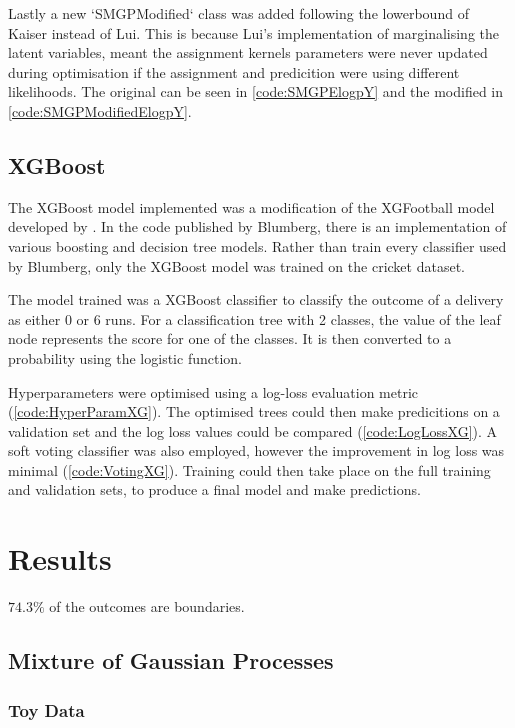 \documentclass[12pt,a4paper]{report}
\theoremstyle{definition}
\begin{document}
Lastly a new `SMGPModified` class was added following the lowerbound of Kaiser instead of Lui.
This is because Lui's implementation of marginalising the latent variables, meant the assignment kernels parameters were never updated during optimisation if the assignment and predicition were using different likelihoods.
The original can be seen in \ref{code:SMGPElogpY} and the modified in \ref{code:SMGPModifiedElogpY}.

\section{XGBoost}

The XGBoost \citep{Chen2016} model implemented was a modification of the XGFootball model developed by \citet{Blumberg2020}.
In the code published by Blumberg, there is an implementation of various boosting and decision tree models.
Rather than train every classifier used by Blumberg, only the XGBoost model was trained on the cricket dataset.

The model trained was a XGBoost classifier to classify the outcome of a delivery as either 0 or 6 runs.
For a classification tree with 2 classes, the value of the leaf node represents the score for one of the classes.
It is then converted to a probability using the logistic function.

Hyperparameters were optimised using a log-loss evaluation metric (\ref{code:HyperParamXG}).
The optimised trees could then make predicitions on a validation set and the log loss values could be compared (\ref{code:LogLossXG}).
A soft voting classifier was also employed, however the improvement in log loss was minimal (\ref{code:VotingXG}).
Training could then take place on the full training and validation sets, to produce a final model and make predictions.

\chapter{Results}

$74.3\%$ of the outcomes are boundaries.

\section{Mixture of Gaussian Processes}

\subsection{Toy Data}
\end{document}
